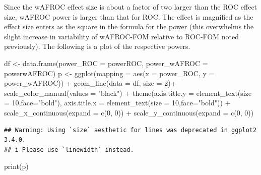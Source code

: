 \documentclass[
]{book}
\newenvironment{Shaded}{\begin{snugshade}}{\end{snugshade}}
\newcommand{\AttributeTok}[1]{\textcolor[rgb]{0.77,0.63,0.00}{#1}}
\newcommand{\DecValTok}[1]{\textcolor[rgb]{0.00,0.00,0.81}{#1}}
\newcommand{\FunctionTok}[1]{\textcolor[rgb]{0.00,0.00,0.00}{#1}}
\newcommand{\NormalTok}[1]{#1}
\newcommand{\OtherTok}[1]{\textcolor[rgb]{0.56,0.35,0.01}{#1}}
\newcommand{\SpecialCharTok}[1]{\textcolor[rgb]{0.00,0.00,0.00}{#1}}
\newcommand{\StringTok}[1]{\textcolor[rgb]{0.31,0.60,0.02}{#1}}
\begin{document}
Since the wAFROC effect size is about a factor of two larger than the ROC effect size, wAFROC power is larger than that for ROC. The effect is magnified as the effect size enters as the square in the formula for the power (this overwhelms the slight increase in variability of wAFROC-FOM relative to ROC-FOM noted previously). The following is a plot of the respective powers.

\begin{Shaded}
\begin{Highlighting}[]
\NormalTok{df }\OtherTok{\textless{}{-}} \FunctionTok{data.frame}\NormalTok{(}\AttributeTok{power\_ROC =}\NormalTok{ powerROC, }\AttributeTok{power\_wAFROC =}\NormalTok{ powerwAFROC)}
\NormalTok{p }\OtherTok{\textless{}{-}} \FunctionTok{ggplot}\NormalTok{(}\AttributeTok{mapping =} \FunctionTok{aes}\NormalTok{(}\AttributeTok{x =}\NormalTok{ power\_ROC, }\AttributeTok{y =}\NormalTok{ power\_wAFROC)) }\SpecialCharTok{+}
  \FunctionTok{geom\_line}\NormalTok{(}\AttributeTok{data =}\NormalTok{ df, }\AttributeTok{size =} \DecValTok{2}\NormalTok{)}\SpecialCharTok{+}
  \FunctionTok{scale\_color\_manual}\NormalTok{(}\AttributeTok{values =} \StringTok{"black"}\NormalTok{) }\SpecialCharTok{+} 
  \FunctionTok{theme}\NormalTok{(}\AttributeTok{axis.title.y =} \FunctionTok{element\_text}\NormalTok{(}\AttributeTok{size =} \DecValTok{10}\NormalTok{,}\AttributeTok{face=}\StringTok{"bold"}\NormalTok{),}
        \AttributeTok{axis.title.x =} \FunctionTok{element\_text}\NormalTok{(}\AttributeTok{size =} \DecValTok{10}\NormalTok{,}\AttributeTok{face=}\StringTok{"bold"}\NormalTok{))  }\SpecialCharTok{+}
  \FunctionTok{scale\_x\_continuous}\NormalTok{(}\AttributeTok{expand =} \FunctionTok{c}\NormalTok{(}\DecValTok{0}\NormalTok{, }\DecValTok{0}\NormalTok{)) }\SpecialCharTok{+} 
  \FunctionTok{scale\_y\_continuous}\NormalTok{(}\AttributeTok{expand =} \FunctionTok{c}\NormalTok{(}\DecValTok{0}\NormalTok{, }\DecValTok{0}\NormalTok{))}
\end{Highlighting}
\end{Shaded}

\begin{verbatim}
## Warning: Using `size` aesthetic for lines was deprecated in ggplot2 3.4.0.
## i Please use `linewidth` instead.
\end{verbatim}

\begin{Shaded}
\begin{Highlighting}[]
\FunctionTok{print}\NormalTok{(p)}
\end{Highlighting}
\end{Shaded}
\end{document}
